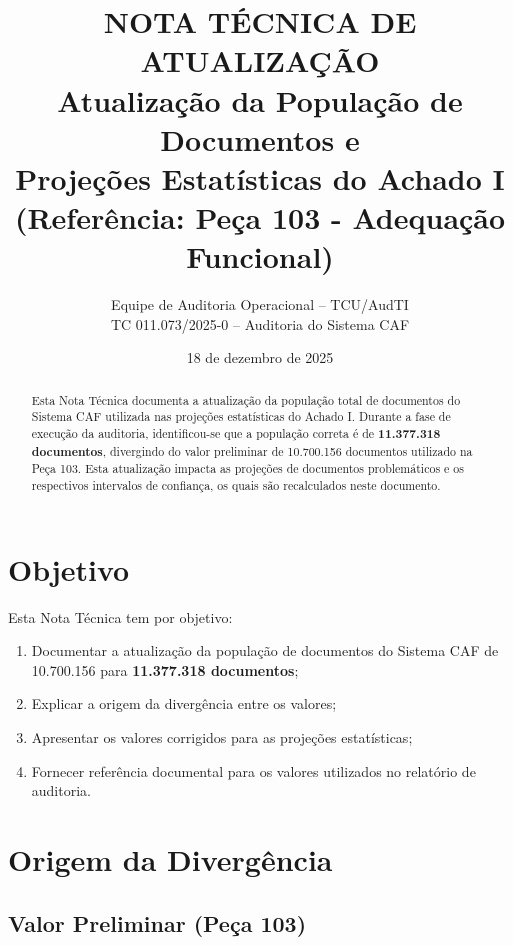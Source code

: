 \documentclass[11pt,a4paper]{article}
\title{
    \textbf{NOTA TÉCNICA DE ATUALIZAÇÃO}\\[0.5cm]
    \Large Atualização da População de Documentos e\\
    Projeções Estatísticas do Achado I\\[0.3cm]
    \large (Referência: Peça 103 - Adequação Funcional)
}
\author{
    Equipe de Auditoria Operacional -- TCU/AudTI\\[0.2cm]
    \small TC 011.073/2025-0 -- Auditoria do Sistema CAF
}
\date{18 de dezembro de 2025}
\begin{document}
\maketitle

\begin{abstract}
Esta Nota Técnica documenta a atualização da população total de documentos do Sistema CAF utilizada nas projeções estatísticas do Achado I. Durante a fase de execução da auditoria, identificou-se que a população correta é de \textbf{11.377.318 documentos}, divergindo do valor preliminar de 10.700.156 documentos utilizado na Peça 103. Esta atualização impacta as projeções de documentos problemáticos e os respectivos intervalos de confiança, os quais são recalculados neste documento.
\end{abstract}

\tableofcontents
\newpage

\section{Objetivo}

Esta Nota Técnica tem por objetivo:

\begin{enumerate}[label=\arabic*)]
    \item Documentar a atualização da população de documentos do Sistema CAF de 10.700.156 para \textbf{11.377.318 documentos};
    \item Explicar a origem da divergência entre os valores;
    \item Apresentar os valores corrigidos para as projeções estatísticas;
    \item Fornecer referência documental para os valores utilizados no relatório de auditoria.
\end{enumerate}

\section{Origem da Divergência}

\subsection{Valor Preliminar (Peça 103)}
\end{document}

